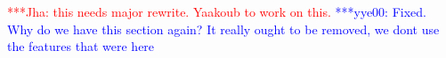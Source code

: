 \documentclass[conference,final]{IEEEtran}
\newcommand{\jhanote}[1]{ {\textcolor{red} { ***Jha: #1 }}}
\newcommand{\yyenote}[1]{ {\textcolor{blue} { ***yye00: #1 }}}
\newcommand{\jhanote}[1]{}
\newcommand{\yyenote}[1]{}
\begin{document}




\jhanote{this needs major rewrite. Yaakoub to work on this.}
\yyenote{Fixed. Why do we have this section again? It really ought to be removed, we dont use the features that were here}
\end{document}
